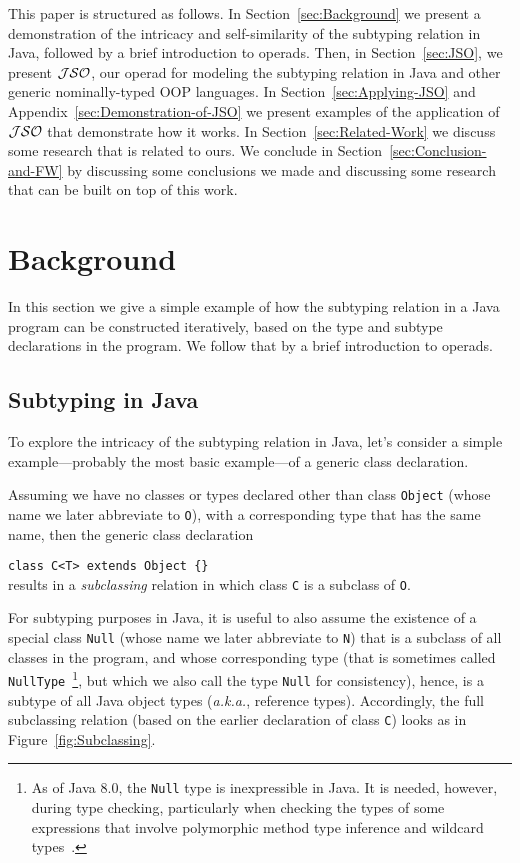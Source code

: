 \documentclass[twocolumn,english]{article}
\numberwithin{equation}{section}
\numberwithin{figure}{section}
\newcommand{\code}[1]{\texttt{#1}}
\begin{document}
This paper is structured as follows. In Section~\ref{sec:Background}
we present a demonstration of the intricacy and self-similarity of
the subtyping relation in Java, followed by a brief introduction to
operads. Then, in Section~\ref{sec:JSO}, we present $\mathcal{JSO}$, our
operad for modeling the subtyping relation in Java and other generic
nominally-typed OOP languages. In Section~\ref{sec:Applying-JSO}
and Appendix~\ref{sec:Demonstration-of-JSO} we present examples
of the application of $\mathcal{JSO}$ that demonstrate how it works. In Section~\ref{sec:Related-Work}
we discuss some research that is related to ours. We conclude in Section~\ref{sec:Conclusion-and-FW}
by discussing some conclusions we made and discussing some research
that can be built on top of this work.


\section{\label{sec:Background}Background}

In this section we give a simple example of how the subtyping relation
in a Java program can be constructed iteratively, based on the type
and subtype declarations in the program. We follow that by a brief
introduction to operads.


\subsection{\label{sub:Subtyping-in-Java}Subtyping in Java}

To explore the intricacy of the subtyping relation in Java, let's
consider a simple example---probably the most basic example---of a
generic class declaration.

Assuming we have no classes or types declared other than class \code{Object}
(whose name we later abbreviate to \code{O}), with a corresponding
type that has the same name, then the generic class declaration

\code{class C<T> extends Object \{\}}\\
results in a \emph{subclassing} relation in which class \code{C}
is a subclass of \code{O}.

For subtyping purposes in Java, it is useful to also assume the existence
of a special class \code{Null} (whose name we later abbreviate to
\code{N}) that is a subclass of all classes in the program, and whose
corresponding type (that is sometimes called \code{NullType}~\cite{JLS05,JLS14}\footnote{As of Java 8.0, the \code{Null} type is inexpressible in Java. It
is needed, however, during type checking, particularly when checking
the types of some expressions that involve polymorphic method type
inference and wildcard types~\cite{JLS05,JLS14}.}, but which we also call the type \code{Null} for consistency), hence,
is a subtype of all Java object types (\emph{a.k.a.}, reference types).
Accordingly, the full subclassing relation (based on the earlier declaration
of class \code{C}) looks as in Figure~\ref{fig:Subclassing}.
\end{document}

